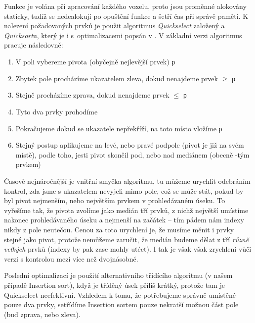         Funkce je volána při zpracování každého voxelu, proto jsou proměnné alokovány staticky, tudíž se nedealokují po opuštění funkce a šetří čas při správě paměti. K nalezení požadovaných prvků je použit algoritmus \emph{Quickselect} založený a \emph{Quicksort}u, který je i s~optimalizacemi popsán v \cite{Numerical Recipes}. V základní verzi algoritmus pracuje následovně:
        \begin{enumerate}
          \item V poli vybereme pivota (obyčejně nejlevější prvek) {\tt p}
          \item Zbytek pole procházíme ukazatelem zleva, dokud nenajdeme prvek $\ge$ {\tt p}
          \item Stejně procházíme zprava, dokud nenajdeme prvek $\le$ {\tt p}
          \item Tyto dva prvky prohodíme
          \item Pokračujeme dokud se ukazatele nepřekříží, na toto místo vložíme {\tt p}
          \item Stejný postup aplikujeme na levé, nebo pravé podpole (pivot je již na svém místě), podle toho, jesti pivot skončil pod, nebo nad mediánem (obecně \kk-tým prvkem)
        \end{enumerate}

        Časově nejnáročnější je vnitřní smyčka algoritmu, tu můžeme urychlit odebráním kontrol, zda jsme s ukazatelem nevyjeli mimo pole, což se může stát, pokud by byl pivot nejmenším, nebo největším prvkem v prohledávaném úseku. To vyřešíme tak, že pivota zvolíme jako medián tří prvků, z nichž největší umístíme nakonec prohledávaného úseku a nejmenší na začátek -- tím pádem nám indexy nikdy z pole neutečou. Cenou za toto urychlení je, že musíme měnit i prvky stejné jako pivot, protože nemůžeme zaručit, že medián budeme dělat z tří \emph{různě velkých} prvků (indexy by pak zase mohly utéct). I tak je však však zrychlení vůči verzi s kontrolou mezí více než dvojnásobné.

        Poslední optimalizací je použití alternativního třídícího algoritmu (v našem případě Insertion sort), když je tříděný úsek příliš krátký, protože tam je Quickselect neefektivní. Vzhledem k tomu, že potřebujeme správně umístěné pouze dva prvky, setřídíme Insertion sortem pouze nekratší možnou část pole (buď zprava, nebo zleva).

